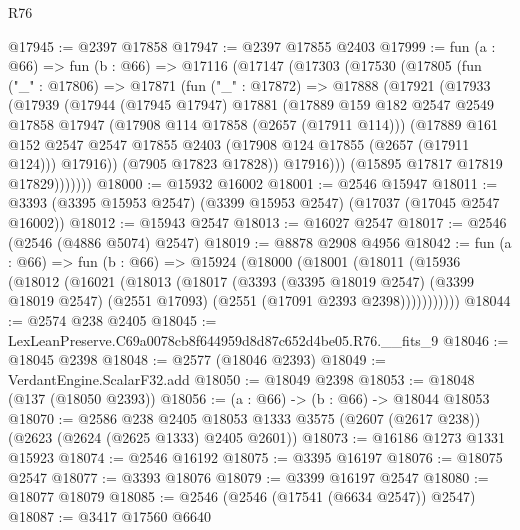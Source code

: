 \begin{lexlean}{R76}
\begin{coremodule}
@17945 := @2397 @17858
@17947 := @2397 @17855 @2403
@17999 := fun (a : @66) =>
  fun (b : @66) =>
  @17116
    (@17147
      (@17303
        (@17530
          (@17805
            (fun ("_" : @17806) =>
            @17871
              (fun ("_" : @17872) =>
              @17888
                (@17921
                  (@17933
                    (@17939
                      (@17944
                        (@17945 @17947)
                        @17881
                        (@17889
                          @159
                          @182
                          @2547
                          @2549
                          @17858
                          @17947
                          (@17908 @114 @17858 (@2657 (@17911 @114)))
                          (@17889
                            @161
                            @152
                            @2547
                            @2547
                            @17855
                            @2403
                            (@17908 @124 @17855 (@2657 (@17911 @124)))
                            @17916))
                        (@7905 @17823 @17828))
                      @17916)))
                (@15895 @17817 @17819 @17829)))))))
@18000 := @15932 @16002
@18001 := @2546 @15947
@18011 := @3393 (@3395 @15953 @2547) (@3399 @15953 @2547) (@17037 (@17045 @2547 @16002))
@18012 := @15943 @2547
@18013 := @16027 @2547
@18017 := @2546 (@2546 (@4886 @5074) @2547)
@18019 := @8878 @2908 @4956
@18042 := fun (a : @66) =>
  fun (b : @66) =>
  @15924
    (@18000
      (@18001
        (@18011
          (@15936
            (@18012
              (@16021
                (@18013
                  (@18017
                    (@3393
                      (@3395 @18019 @2547)
                      (@3399 @18019 @2547)
                      (@2551 @17093)
                      (@2551 (@17091 @2393 @2398)))))))))))
@18044 := @2574 @238 @2405
@18045 := LexLeanPreserve.C69a0078cb8f644959d8d87c652d4be05.R76.__fits_9
@18046 := @18045 @2398
@18048 := @2577 (@18046 @2393)
@18049 := VerdantEngine.ScalarF32.add
@18050 := @18049 @2398
@18053 := @18048 (@137 (@18050 @2393))
@18056 := (a : @66) -> (b : @66) -> @18044 @18053
@18070 := @2586
    @238
    @2405
    @18053
    @1333
    @3575
    (@2607 (@2617 @238))
    (@2623 (@2624 (@2625 @1333) @2405 @2601))
@18073 := @16186 @1273 @1331 @15923
@18074 := @2546 @16192
@18075 := @3395 @16197
@18076 := @18075 @2547
@18077 := @3393 @18076
@18079 := @3399 @16197 @2547
@18080 := @18077 @18079
@18085 := @2546 (@2546 (@17541 (@6634 @2547)) @2547)
@18087 := @3417 @17560 @6640

\end{coremodule}
\end{lexlean}

